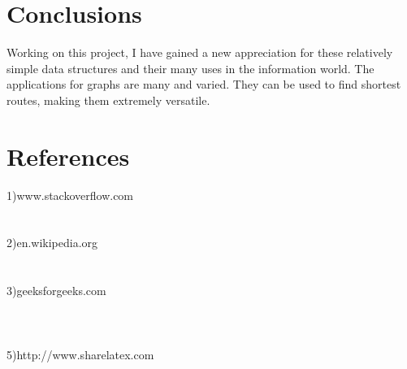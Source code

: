 \documentclass[14pt]{article}
\begin{document}
\newpage
\section*{Conclusions}
\vspace{20 mm}
Working on this project, I have gained a new appreciation for these relatively simple data structures and their many uses in the information world. The applications for graphs are many and varied. They can be used to find shortest routes, making them extremely versatile. 
\\\vspace{20mm}
\section*{References}
\large 1)www.stackoverflow.com
\\
\\\vspace{6mm}
\\
2)en.wikipedia.org
\\
\\\vspace{6mm}
\\
3)geeksforgeeks.com
\\
\\
\\\vspace{6mm}
\\
5)http://www.sharelatex.com
\end{document}
